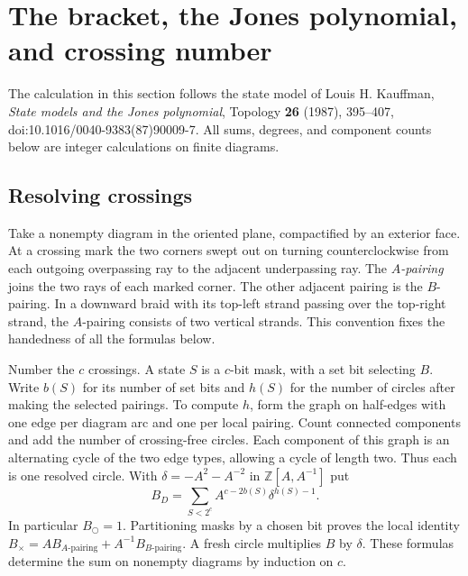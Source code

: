 \section{The bracket, the Jones polynomial, and crossing number}
\label{sec:bracket}

The calculation in this section follows the state model of Louis H. Kauffman,
\emph{State models and the Jones polynomial}, Topology \textbf{26} (1987),
395--407, doi:10.1016/0040-9383(87)90009-7. All sums, degrees, and component
counts below are integer calculations on finite diagrams.

\subsection{Resolving crossings}

Take a nonempty diagram in the oriented plane, compactified by an exterior
face. At a crossing mark the two corners swept out on turning
counterclockwise from each outgoing overpassing ray to the adjacent
underpassing ray. The \emph{$A$-pairing} joins the two rays of each marked
corner. The other adjacent pairing is the $B$-pairing. In a downward braid
with its top-left strand passing over the top-right strand, the $A$-pairing
consists of two vertical strands. This convention fixes the handedness of all
the formulas below.

Number the $c$ crossings. A state $S$ is a $c$-bit mask, with a set bit
selecting $B$. Write $b(S)$ for its number of set bits and $h(S)$ for the
number of circles after making the selected pairings. To compute $h$, form
the graph on half-edges with one edge per diagram arc and one per local
pairing. Count connected components and add the number of crossing-free
circles. Each component of this graph is an alternating cycle of the two
edge types, allowing a cycle of length two. Thus each is one resolved
circle. With $\delta=-A^2-A^{-2}$ in $\mathbb Z[A,A^{-1}]$ put
\[
 B_D=\sum_{S<2^c} A^{c-2b(S)}\delta^{h(S)-1}.
\]
In particular $B_{\bigcirc}=1$. Partitioning masks by a chosen bit proves the
local identity $B_{\times}=A B_{A\text{-pairing}}+
A^{-1}B_{B\text{-pairing}}$. A fresh circle multiplies $B$ by $\delta$.
These formulas determine the sum on nonempty diagrams by induction on $c$.


